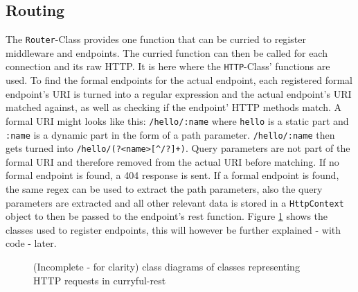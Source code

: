 \documentclass[a4paper]{article}
\newenvironment{enum}[3][]%
{
\begin{classAndInterfaceCommon}{#1}{#2}{#3}
}%
{\node[umlcd style enum, anchor=north] (\umlcdClassName) at (\umlcdClassPos)
    {$<<$enumeration$>>$ \\ \textbf{\umlcdClassName}
\nodepart{second}
\umlcdClassAttributes
};
\end{classAndInterfaceCommon}
}
\begin{document}
\subsection{Routing}
The \verb|Router|-Class provides one function that can be curried to register
middleware and endpoints. The curried function can then be called for each
connection and its raw HTTP. It is here where the \verb|HTTP|-Class' functions
are used. To find the formal endpoints for the actual endpoint, each registered
formal endpoint's URI is turned into a regular expression and the actual
endpoint's URI matched against, as well as checking if the endpoint' HTTP
methods match. A formal URI might looks like this: \verb|/hello/:name| where
\verb|hello| is a static part and \verb|:name| is a dynamic part in the form of
a path parameter. \verb|/hello/:name| then gets turned into
\verb|/hello/(?<name>[^/?]+)|. Query parameters are not part of the formal URI
and therefore removed from the actual URI before matching. If no formal endpoint
is found, a 404 response is sent. If a formal endpoint is found, the same regex
can be used to extract the path parameters, also the query parameters are
extracted and all other relevant data is stored in a \verb|HttpContext| object
to then be passed to the endpoint's rest function.
Figure \ref{figure:routing-classes} shows the classes used to register
endpoints, this will however be further explained - with code - later.

\begin{figure}[H]
	\begin{center}
	\end{center}
	\caption{(Incomplete - for clarity) class diagrams of classes representing
			HTTP requests in curryful-rest}
	\label{figure:routing-classes}
\end{figure}
\end{document}
